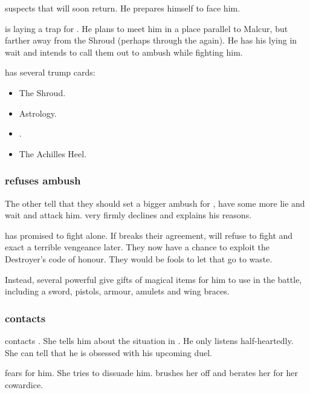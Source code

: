 
\Teshrial{} suspects that \Ishnaruchaefir{} will soon return. 
He prepares himself to face him. 

\Teshrial{} is laying a trap for \Ishnaruchaefir. 
He plans to meet him in a place parallel to Malcur, but farther away from the Shroud (perhaps through the  again). 
He has his \noggyaleth{} lying in wait and intends to call them out to ambush \Ishnaruchaefir{} while fighting him. 

\Teshrial{} has several trump cards:
\begin{itemize}
  \item The Shroud.
  \item Astrology. 
  \item \Noggyaleth.
  \item The Achilles Heel. 
\end{itemize}





\subsubsection{\Teshrial refuses ambush}
The other \resphain tell \Teshrial that they should set a bigger ambush for \Ishnaruchaefir, have some more \resphain lie and wait and attack him. 
\Teshrial very firmly declines and explains his reasons.

\Ishnaruchaefir has promised to fight \Teshrial alone.
If \Teshrial breaks their agreement, \Ishnaruchaefir will refuse to fight and exact a terrible vengeance later. 
They now have a chance to exploit the Destroyer's code of honour. 
They would be fools to let that go to waste. 

Instead, several powerful \resphain give \Teshrial gifts of magical items for him to use in the battle, including a sword, pistols, armour, amulets and wing braces.





\subsubsection{\Achsah contacts \Teshrial}
\Achsah contacts \Teshrial. 
She tells him about the situation in \Forclin.
He only listens half-heartedly.
She can tell that he is obsessed with his upcoming duel. 

\Achsah fears for him. 
She tries to dissuade him. 
\Teshrial brushes her off and berates her for her cowardice.

